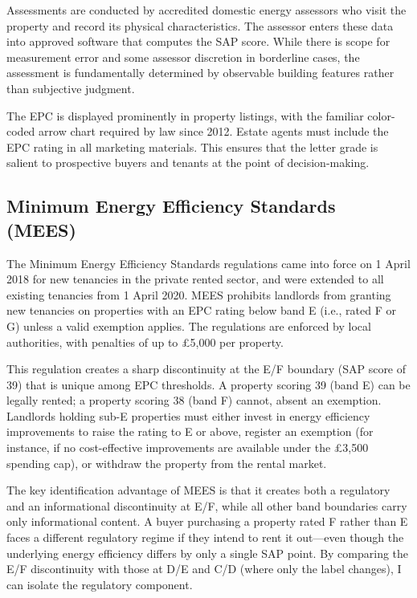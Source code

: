 \documentclass[12pt]{article}
\begin{document}
Assessments are conducted by accredited domestic energy assessors who visit the property and record its physical characteristics. The assessor enters these data into approved software that computes the SAP score. While there is scope for measurement error and some assessor discretion in borderline cases, the assessment is fundamentally determined by observable building features rather than subjective judgment.

The EPC is displayed prominently in property listings, with the familiar color-coded arrow chart required by law since 2012. Estate agents must include the EPC rating in all marketing materials. This ensures that the letter grade is salient to prospective buyers and tenants at the point of decision-making.

\subsection{Minimum Energy Efficiency Standards (MEES)}

The Minimum Energy Efficiency Standards regulations came into force on 1 April 2018 for new tenancies in the private rented sector, and were extended to all existing tenancies from 1 April 2020. MEES prohibits landlords from granting new tenancies on properties with an EPC rating below band E (i.e., rated F or G) unless a valid exemption applies. The regulations are enforced by local authorities, with penalties of up to \pounds 5,000 per property.

This regulation creates a sharp discontinuity at the E/F boundary (SAP score of 39) that is unique among EPC thresholds. A property scoring 39 (band E) can be legally rented; a property scoring 38 (band F) cannot, absent an exemption. Landlords holding sub-E properties must either invest in energy efficiency improvements to raise the rating to E or above, register an exemption (for instance, if no cost-effective improvements are available under the \pounds 3,500 spending cap), or withdraw the property from the rental market.

The key identification advantage of MEES is that it creates both a regulatory and an informational discontinuity at E/F, while all other band boundaries carry only informational content. A buyer purchasing a property rated F rather than E faces a different regulatory regime if they intend to rent it out---even though the underlying energy efficiency differs by only a single SAP point. By comparing the E/F discontinuity with those at D/E and C/D (where only the label changes), I can isolate the regulatory component.
\end{document}

